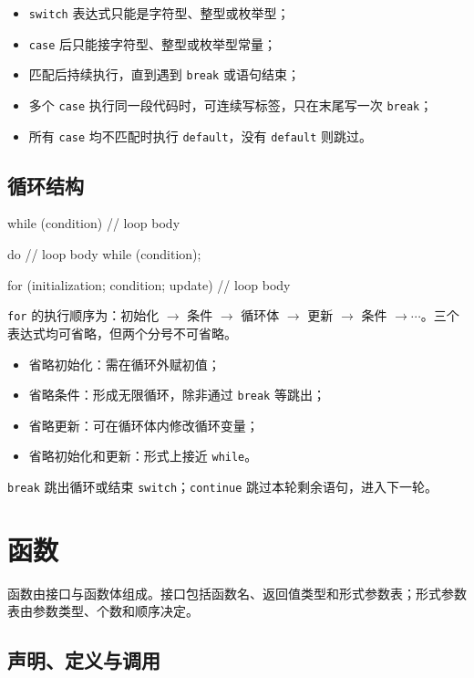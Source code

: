 \documentclass[UTF8,fontset=fandol,zihao=5]{ctexart}
\newcommand{\code}[1]{\texttt{#1}}
\begin{document}
\begin{itemize}
  \item \code{switch} 表达式只能是字符型、整型或枚举型；
  \item \code{case} 后只能接字符型、整型或枚举型常量；
  \item 匹配后持续执行，直到遇到 \code{break} 或语句结束；
  \item 多个 \code{case} 执行同一段代码时，可连续写标签，只在末尾写一次 \code{break}；
  \item 所有 \code{case} 均不匹配时执行 \code{default}，没有 \code{default} 则跳过。
\end{itemize}

\subsection{循环结构}

\begin{cppcode}[三种循环]
while (condition) {
    // loop body
}

do {
    // loop body
} while (condition);

for (initialization; condition; update) {
    // loop body
}
\end{cppcode}

\code{for} 的执行顺序为：初始化 $\to$ 条件 $\to$ 循环体 $\to$ 更新 $\to$ 条件 $\to\cdots$。三个表达式均可省略，但两个分号不可省略。

\begin{itemize}
  \item 省略初始化：需在循环外赋初值；
  \item 省略条件：形成无限循环，除非通过 \code{break} 等跳出；
  \item 省略更新：可在循环体内修改循环变量；
  \item 省略初始化和更新：形式上接近 \code{while}。
\end{itemize}

\code{break} 跳出循环或结束 \code{switch}；\code{continue} 跳过本轮剩余语句，进入下一轮。

\section{函数}

函数由接口与函数体组成。接口包括函数名、返回值类型和形式参数表；形式参数表由参数类型、个数和顺序决定。

\subsection{声明、定义与调用}
\end{document}
